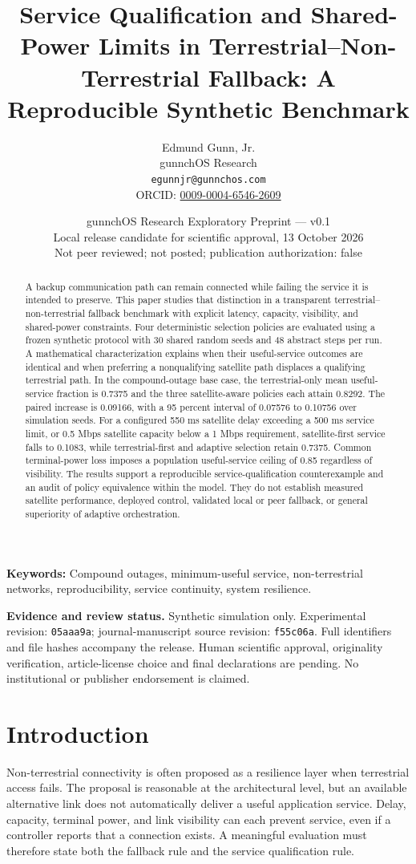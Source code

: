 \documentclass[10pt,twocolumn]{article}
\title{Service Qualification and Shared-Power Limits in Terrestrial--Non-Terrestrial Fallback: A Reproducible Synthetic Benchmark}
\author{Edmund Gunn, Jr.\\gunnchOS Research\\\texttt{egunnjr@gunnchos.com}\\ORCID: \href{https://orcid.org/0009-0004-6546-2609}{0009-0004-6546-2609}}
\date{gunnchOS Research Exploratory Preprint --- v0.1\\Local release candidate for scientific approval, 13 October 2026\\Not peer reviewed; not posted; publication authorization: false}
\begin{document}
\maketitle
\begin{abstract}

A backup communication path can remain connected while failing the service it is intended to preserve. This paper studies that distinction in a transparent terrestrial--non-terrestrial fallback benchmark with explicit latency, capacity, visibility, and shared-power constraints. Four deterministic selection policies are evaluated using a frozen synthetic protocol with 30 shared random seeds and 48 abstract steps per run. A mathematical characterization explains when their useful-service outcomes are identical and when preferring a nonqualifying satellite path displaces a qualifying terrestrial path. In the compound-outage base case, the terrestrial-only mean useful-service fraction is 0.7375 and the three satellite-aware policies each attain 0.8292. The paired increase is 0.09166, with a 95 percent interval of 0.07576 to 0.10756 over simulation seeds. For a configured 550 ms satellite delay exceeding a 500 ms service limit, or 0.5 Mbps satellite capacity below a 1 Mbps requirement, satellite-first service falls to 0.1083, while terrestrial-first and adaptive selection retain 0.7375. Common terminal-power loss imposes a population useful-service ceiling of 0.85 regardless of visibility. The results support a reproducible service-qualification counterexample and an audit of policy equivalence within the model. They do not establish measured satellite performance, deployed control, validated local or peer fallback, or general superiority of adaptive orchestration.

\end{abstract}
\noindent\textbf{Keywords:} 
Compound outages, minimum-useful service, non-terrestrial networks, reproducibility, service continuity, system resilience.


\noindent\textbf{Evidence and review status.} Synthetic simulation only. Experimental revision: \texttt{05aaa9a}; journal-manuscript source revision: \texttt{f55c06a}. Full identifiers and file hashes accompany the release. Human scientific approval, originality verification, article-license choice and final declarations are pending. No institutional or publisher endorsement is claimed.

\section{Introduction}
Non-terrestrial connectivity is often proposed as a resilience layer when terrestrial access fails. The proposal is reasonable at the architectural level, but an available alternative link does not automatically deliver a useful application service. Delay, capacity, terminal power, and link visibility can each prevent service, even if a controller reports that a connection exists. A meaningful evaluation must therefore state both the fallback rule and the service qualification rule.
\end{document}
